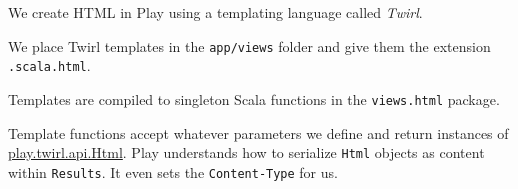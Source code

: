 \documentclass[oneside,11pt,a4paper,]{book}
\begin{document}
We create HTML in Play using a templating language called \emph{Twirl}.

We place Twirl templates in the \texttt{app/views} folder and give them
the extension \texttt{.scala.html}.

Templates are compiled to singleton Scala functions in the
\texttt{views.html} package.

Template functions accept whatever parameters we define and return
instances of
\href{https://github.com/playframework/twirl/blob/master/api/src/main/scala/play/twirl/api/Formats.scala}{play.twirl.api.Html}.
Play understands how to serialize \texttt{Html} objects as content
within \texttt{Results}. It even sets the \texttt{Content-Type} for us.
\end{document}
